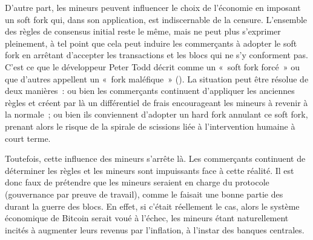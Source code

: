 D'autre part, les mineurs peuvent influencer le choix de l'économie en imposant un soft fork qui, dans son application, est indiscernable de la censure. L'ensemble des règles de consensus initial reste le même, mais ne peut plus s'exprimer pleinement, à tel point que cela peut induire les commerçants à adopter le soft fork en arrêtant d'accepter les transactions et les blocs qui ne s'y conforment pas. C'est ce que le développeur Peter Todd décrit comme un «~soft fork forcé~» ou que d'autres appellent un «~fork maléfique~» (). La situation peut être résolue de deux manières~: ou bien les commerçants continuent d'appliquer les anciennes règles et créent par là un différentiel de frais encourageant les mineurs à revenir à la normale~; ou bien ils conviennent d'adopter un hard fork annulant ce soft fork, prenant alors le risque de la spirale de scissions liée à l'intervention humaine à court terme.

Toutefois, cette influence des mineurs s'arrête là. Les commerçants continuent de déterminer les règles et les mineurs sont impuissants face à cette réalité. Il est donc faux de prétendre que les mineurs seraient en charge du protocole (gouvernance par preuve de travail), comme le faisait une bonne partie des  durant la guerre des blocs. En effet, si c'était réellement le cas, alors le système économique de Bitcoin serait voué à l'échec, les mineurs étant naturellement incités à augmenter leurs revenus par l'inflation, à l'instar des banques centrales.

